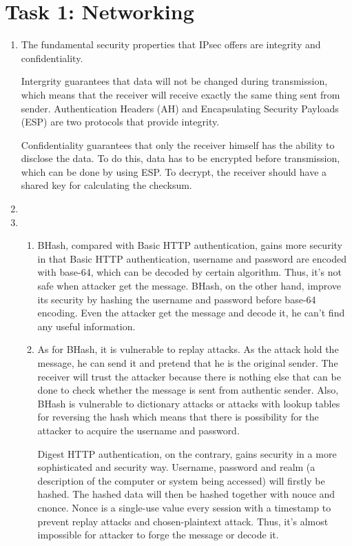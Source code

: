 \section*{Task 1: Networking}
\begin{enumerate}
\item %
  The fundamental security properties that IPsec offers are integrity and confidentiality.
   \par Intergrity guarantees that data will not be changed during transmission, which means that the receiver will receive exactly the same thing sent from sender. Authentication Headers (AH) and Encapsulating Security Payloads (ESP) are two protocols that provide integrity.
   \par Confidentiality guarantees that only the receiver himself has the ability to disclose the data. To do this, data has to be encrypted before transmission, which can be done by using ESP. To decrypt, the receiver should have a shared key for calculating the checksum. 
  \item \highergradesonly
  \item %
    \begin{enumerate}
    \item
      BHash, compared with Basic HTTP authentication, gains more security in that Basic HTTP authentication, username and password are encoded with base-64, which can be decoded by certain algorithm. Thus, it's not safe when attacker get the message. BHash, on the other hand, improve its security by hashing the username and password before base-64 encoding. Even the attacker get the message and decode it, he can't find any useful information.  
    \item
    As for BHash, it is vulnerable to replay attacks. As the attack hold the message, he can send it and pretend that he is the original sender. The receiver will trust the attacker because there is nothing else that can be done to check whether the message is sent from authentic sender.
    Also, BHash is vulnerable to dictionary attacks or attacks with lookup tables for reversing the hash which means that there is possibility for the attacker to acquire the username and password.
   \par Digest HTTP authentication, on the contrary, gains security in a more sophisticated and security way. Username, password and realm (a description of the computer or system being accessed) will firstly be hashed. The hashed data will then be hashed together with nouce and cnonce. Nonce is a single-use value every session with a timestamp to prevent replay attacks and chosen-plaintext attack. Thus, it's almost impossible for attacker to forge the message or decode it.
    \end{enumerate}
\end{enumerate}
